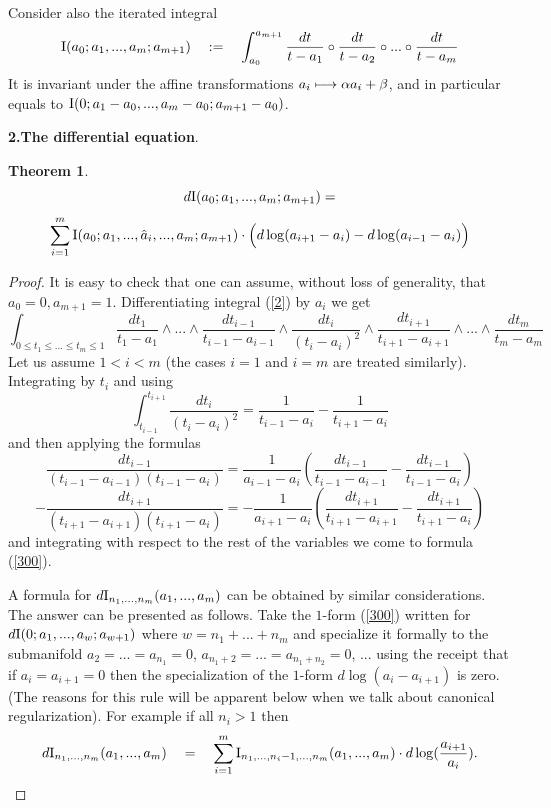 \documentclass[10pt]{article}
\newtheorem{theorem}{Theorem}[section]
\begin{document}
Consider also the iterated integral
\begin{equation} \label{2**}
{\rm I}(a_0; a_1, ... ,a_m; a_{m+1}) \quad : = \quad \int_{a_0}^{a_{m+1}} \frac{dt}{t-a_{1}} \circ \frac{dt}{t-a_{2}} \circ ... \circ 
\frac{dt}{t-a_{m}}
\end{equation}
It is invariant under the affine transformations $a_i \longmapsto \alpha a_i + \beta$, and in particular  equals to ${\rm I}(0; a_1-a_0, ... ,a_m-a_0; a_{m+1}-a_0)$.  

{\bf 2.The differential equation}. 
 \begin{theorem} \label{2.2} 
$$
d{\rm I}(a_0; a_{1},...,a_{m}; a_{m+1}) = 
$$
\begin{equation} \label{300}
\sum_{i=1}^m {\rm I}(a_0; a_{1},...,\hat a_{i},...,a_m; a_{m+1})\cdot \Bigl(
d\log(a_{i+1} - a_i) - d\log(a_{i-1} - a_i) \Bigr)
\end{equation}
\end{theorem}

\begin{proof} It is easy to check that one can assume, without loss of generality, that $a_0 =0, a_{m+1} =1$. 
Differentiating integral (\ref{2})  by $a_i$ we get
$$
\int_{0 \leq t_1 \leq  ... \leq  t_m \leq 1} 
\frac{dt_1}{t_1-a_1} \wedge ... \wedge \frac{dt_{i-1}}{t_{i-1} - a_{i-1}} \wedge \frac{dt_i}{(t_i-a_i)^2} 
\wedge \frac{dt_{i+1}}{t_{i+1} - a_{i+1}} \wedge ... \wedge \frac{dt_m}{t_m-a_m} 
$$
Let us assume $1 < i < m$ (the cases $i=1$ and $i=m$ are treated similarly). 
 Integrating by $t_i$ and using  
$$
\int_{t_{i-1}}^{t_{i+1}}\frac{dt_i}{(t_i-a_i)^2} = \frac{1}{t_{i-1}-a_i} - \frac{1}{t_{i+1}-a_i}
$$
and then applying the formulas 
$$
\frac{dt_{i-1}}{(t_{i-1}-a_{i-1})(t_{i-1}-a_{i})} = 
 \frac{1}{a_{i-1}-a_i}\left( \frac{dt_{i-1}}{t_{i-1}-a_{i-1}}  - 
\frac{dt_{i-1}}{t_{i-1}-a_{i}} \right)
$$
$$
-\frac{dt_{i+1}}{(t_{i+1}-a_{i+1})(t_{i+1}-a_{i})} =
 -\frac{1}{a_{i+1}-a_i}\left( \frac{dt_{i+1}}{t_{i+1}-a_{i+1}}  - 
\frac{dt_{i+1}}{t_{i+1}-a_{i}} \right)
$$
and integrating with respect to the rest of the variables we come to formula (\ref{300}). 

A formula for $d{\rm I}_{n_{1},...,n_{m}}(a_{1},...,a_{m})$ can be obtained by similar considerations. The answer can be presented as follows. 
Take the $1$-form (\ref{300}) written for 
$d{\rm I}(0; a_1, ..., a_{w}; a_{w+1})$ where $w = n_1+...+n_m$ and specialize it formally to 
the submanifold $a_2 = ... = a_{n_1} = 0$, 
$a_{n_{1}+2} = ... = a_{n_1+n_2} = 0$, ...  
using the receipt that if $a_i = a_{i+1} =0$ 
then the specialization of the $1$-form $d\log(a_i-a_{i+1})$ is zero. 
(The reasons for this rule will be apparent below when we 
 talk about canonical regularization).  
For example if all $n_i >1$ then
\begin{equation} \label{3000}
d{\rm I}_{n_1,...,n_m}(a_{1},...,a_{m}) \quad = \quad \sum_{i=1}^m {\rm I}_{n_1,...,n_i-1,...,n_m}(a_{1},...,a_m)\cdot d\log(\frac{a_{i+1}}{a_i}).
\end{equation}


\end{proof}
\end{document}
